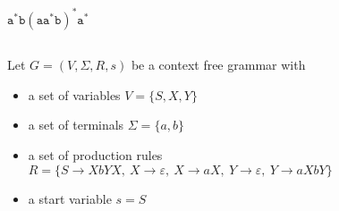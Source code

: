 \documentclass[10pt]{article} %
\begin{document}
\subsection{}
$\mathtt{a^*b(aa^*b)^*a^*}$
\subsection{}
Let $G=(V,\Sigma,R,s)$ be a context free grammar with
\begin{itemize}
	\item a set of variables $V=\{S,X,Y\}$
	\item a set of terminals $\Sigma = \{a,b\}$
	\item a set of production rules $R = \{S \to XbYX, \ X \to \varepsilon, \ X \to aX, \ Y \to \varepsilon, \ Y \to aXbY\}$
	\item a start variable $s=S$
\end{itemize}
\end{document}

